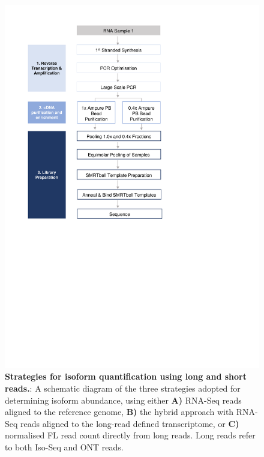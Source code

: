 \begin{figure}[htp]
	\begin{center}
		\includegraphics[page=8,trim={2cm 19cm 2cm 1cm},clip, scale = 0.8]{Figures/ProjectDevelopment_Figures.pdf}
	\end{center}
	\captionsetup{width=0.95\textwidth}
	\caption[Strategies for isoform quantification]%
	{\textbf{Strategies for isoform quantification using long and short reads.}: A schematic diagram of the three strategies adopted for determining isoform abundance, using either \textbf{A)} RNA-Seq reads aligned to the reference genome, \textbf{B)} the hybrid approach with RNA-Seq reads aligned to the long-read defined transcriptome, or \textbf{C)} normalised FL read count directly from long reads. Long reads refer to both Iso-Seq and ONT reads.}
	\label{fig:isoform_quant_strategy}
\end{figure}


